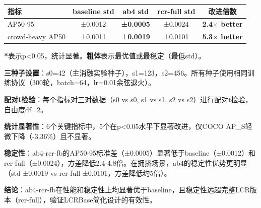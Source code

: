 \begin{table}[t]
\begin{tabular}{l|ccc|c|ccc|c|cc}
\hline
\textbf{指标} & \multicolumn{3}{c|}{\textbf{baseline std}} & \multicolumn{3}{c|}{\textbf{ab4 std}} & \multicolumn{3}{c|}{\textbf{rcr-full std}} & \textbf{改进倍数} \\
\hline
AP50-95 & \multicolumn{3}{c|}{±0.0012} & \multicolumn{3}{c|}{\textbf{±0.0005}} & \multicolumn{3}{c|}{±0.0024} & \textbf{2.4$\times$ better} \\
crowd-heavy AP50 & \multicolumn{3}{c|}{±0.0011} & \multicolumn{3}{c|}{\textbf{±0.0019}} & \multicolumn{3}{c|}{±0.0101} & \textbf{5.3$\times$ better} \\
\hline
\end{tabular}
\begin{tablenotes}
\small
\item \textbf{*}表示p<0.05，统计显著。\textbf{粗体}表示最优值或最稳定（最低std）。
\item \textbf{三种子设置}：s0=42（主消融实验种子），s1=123，s2=456。所有种子使用相同训练协议（300轮，batch=64，lr=0.01余弦退火）。
\item \textbf{配对t检验}：每个指标对三对数据（s0 vs s0, s1 vs s1, s2 vs s2）进行配对t检验，自由度df=2。
\item \textbf{统计显著性}：6个关键指标中，5个在p<0.05水平下显著改进，仅COCO AP\_S轻微下降（-3.36\%）且不显著。
\item \textbf{稳定性}：ab4-rcr-fb的AP50-95标准差（±0.0005）显著低于baseline（±0.0012）和rcr-full（±0.0024），方差降低2.4-4.8倍。在拥挤场景，ab4的稳定性优势更明显（std ±0.0019 vs rcr-full ±0.0101，方差降低约5倍）。
\item \textbf{结论}：ab4-rcr-fb在性能和稳定性上均显著优于baseline，且稳定性远超完整LCR版本（rcr-full），验证LCRBase简化设计的有效性。
\end{tablenotes}
\end{table}
